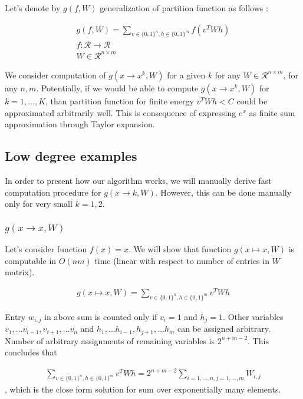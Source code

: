 \documentclass{article}
\begin{document}
Let's denote by $g(f, W)$ generalization of partition function as follows : 

\begin{gather*}
g(f, W) = \sum_{v \in \{0, 1\}^n, h \in \{0, 1\}^m} f(v^TWh) \\
f : \mathcal{R} \rightarrow \mathcal{R}\\
W \in \mathcal{R}^{n \times m}
\end{gather*}

We consider computation of $g(x \rightarrow x^k, W)$ for a given $k$ for any $W
\in \mathcal{R}^{n \times m}$, for any $n, m$. Potentially, if we would be able
to compute $g(x \rightarrow x^k, W)$ for $k = 1, \dots, K$, than partition
function for finite energy $v^TWh < C$ could be approximated arbitrarily well.
This is consequence of expressing $e^{x}$ as finite sum approximation through
Taylor expansion.

\subsection{Low degree examples} In order to present how our algorithm works,
we will manually derive fast computation procedure for $g(x \rightarrow k, W)$.
However, this can be done manually only for very small $k = 1, 2$. 


\subsubsection{$g(x \rightarrow x, W)$} Let's consider function $f(x) = x$. We
will show that function $g(x \mapsto x, W)$ is computable in $O(nm)$ time
(linear with respect to number of entries in $W$ matrix).
 
\begin{gather*}
	g(x \mapsto x, W) = \sum_{v \in \{0, 1\}^n, h \in \{0, 1\}^m} v^TWh
\end{gather*}

Entry $w_{i,j}$ in above sum is counted only if $v_i = 1$ and $h_j = 1$. Other variables
$v_1, \dots v_{i-1}, v_{i+1}, \dots v_n$ and $h_1, \dots h_{i-1}, h_{j+1}, \dots h_m$ can be 
assigned arbitrary. Number of arbitrary assignments of remaining variables is $2^{n + m - 2}$. 
This concludes that 

\begin{gather*}
	\sum_{v \in \{0, 1\}^n, h \in \{0, 1\}^m} v^TWh = 2^{n + m - 2}\sum_{i = 1, \dots, n, j = 1, \dots, m} W_{i, j}
\end{gather*}
, which is the close form solution for sum over exponentially many elements.
\end{document}
